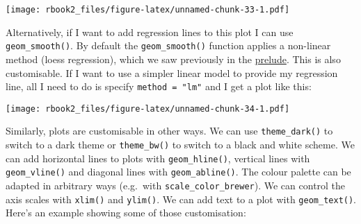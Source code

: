 \documentclass[]{book}
\newenvironment{Shaded}{\begin{snugshade}}{\end{snugshade}}
\newcommand{\DataTypeTok}[1]{\textcolor[rgb]{0.13,0.29,0.53}{#1}}
\newcommand{\DecValTok}[1]{\textcolor[rgb]{0.00,0.00,0.81}{#1}}
\newcommand{\KeywordTok}[1]{\textcolor[rgb]{0.13,0.29,0.53}{\textbf{#1}}}
\newcommand{\NormalTok}[1]{#1}
\newcommand{\OperatorTok}[1]{\textcolor[rgb]{0.81,0.36,0.00}{\textbf{#1}}}
\newcommand{\StringTok}[1]{\textcolor[rgb]{0.31,0.60,0.02}{#1}}
\begin{document}
\texttt{[image: rbook2\_files/figure-latex/unnamed-chunk-33-1.pdf]}

Alternatively, if I want to add regression lines to this plot I can use \texttt{geom\_smooth()}. By default the \texttt{geom\_smooth()} function applies a non-linear method (loess regression), which we saw previously in the \href{./prelude-to-data.html}{prelude}. This is also customisable. If I want to use a simpler linear model to provide my regression line, all I need to do is specify \texttt{method\ =\ "lm"} and I get a plot like this:

\begin{Shaded}
\end{Shaded}

\texttt{[image: rbook2\_files/figure-latex/unnamed-chunk-34-1.pdf]}

Similarly, plots are customisable in other ways. We can use \texttt{theme\_dark()} to switch to a dark theme or \texttt{theme\_bw()} to switch to a black and white scheme. We can add horizontal lines to plots with \texttt{geom\_hline()}, vertical lines with \texttt{geom\_vline()} and diagonal lines with \texttt{geom\_abline()}. The colour palette can be adapted in arbitrary ways (e.g.~with \texttt{scale\_color\_brewer}). We can control the axis scales with \texttt{xlim()} and \texttt{ylim()}. We can add text to a plot with \texttt{geom\_text()}. Here's an example showing some of those customisation:
\end{document}
